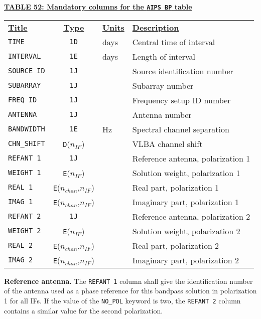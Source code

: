 \documentclass[twoside]{article}
\newcommand{\nif}{$n_{IF}$}
\newcommand{\nchan}{$n_{chan}$}
\begin{document}
\begin{center}
\underline{\bf{TABLE 52: Mandatory columns for the {\tt AIPS BP} table}}\\
\begin{tabular}{lcll}
\noalign{\vspace{2pt}} \label{ta:BPcols}
\underline{{\bf Title\vphantom{y}}} & \underline{\bf{Type}} &
   \underline{{\bf Units\vphantom{y}}} & \underline{\bf{Description}} \\
\noalign{\vspace{2pt}}
{\tt TIME}       & {\tt 1D} & days & Central time of interval \\
{\tt INTERVAL}   & {\tt 1E} & days & Length of interval \\
{\tt SOURCE ID}  & {\tt 1J} &      & Source identification number \\
{\tt SUBARRAY}   & {\tt 1J} &      & Subarray number \\
{\tt FREQ ID}    & {\tt 1J} &      & Frequency setup ID number \\
{\tt ANTENNA}    & {\tt 1J} &      & Antenna number \\
{\tt BANDWIDTH}  & {\tt 1E} & Hz   & Spectral channel separation \\
{\tt CHN\_SHIFT} & {\tt D}(\nif) & & VLBA channel shift \\
{\tt REFANT 1}   & {\tt 1J} &      & Reference antenna, polarization 1 \\
{\tt WEIGHT 1}   & {\tt E}(\nif) & & Solution weight, polarization 1 \\
{\tt REAL 1}     & {\tt E}(\nchan,\nif) & & Real part, polarization 1 \\
{\tt IMAG 1}     & {\tt E}(\nchan,\nif) & & Imaginary part, polarization 1 \\
\hline
{\tt REFANT 2}   & {\tt 1J} &      & Reference antenna, polarization 2 \\
{\tt WEIGHT 2}   & {\tt E}(\nif) & & Solution weight, polarization 2 \\
{\tt REAL 2}     & {\tt E}(\nchan,\nif) & & Real part, polarization 2 \\
{\tt IMAG 2}     & {\tt E}(\nchan,\nif) & & Imaginary part, polarization 2
\end{tabular}
\end{center}

{\bf Reference antenna.} The {\tt REFANT 1} column shall give the
identification number of the antenna used as a phase reference for
this bandpass solution in polarization 1 for all IFs.  If the value of
the {\tt NO\_POL} keyword is two, the {\tt REFANT 2} column contains a
similar value for the second polarization.
\end{document}

